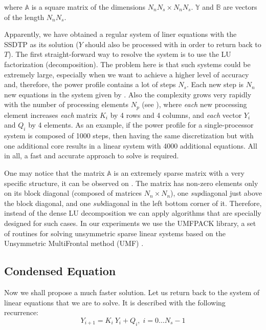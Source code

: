 where $\mathbb{A}$ is a square matrix of the dimensions $N_n N_s \times N_n N_s$. $\mathbb{Y}$ and $\mathbb{B}$ are vectors of the length $N_n N_s$.

Apparently, we have obtained a regular system of liner equations with the SSDTP as its solution ($Y$ should also be processed with  in order to return back to $T$). The first straight-forward way to resolve the system is to use the LU factorization (decomposition). The problem here is that such systems could be extremely large, especially when we want to achieve a higher level of accuracy and, therefore, the power profile contains a lot of steps $N_s$. Each new step is $N_n$ new equations in the system given by . Also the complexity grows very rapidly with the number of processing elements $N_p$ (see ), where \emph{each} new processing element increases \emph{each} matrix $K_i$ by 4 rows and 4 columns, and \emph{each} vector $Y_i$ and $Q_i$ by 4 elements. As an example, if the power profile for a single-processor system is composed of 1000 steps, then having the same discretization but with one additional core results in a linear system with 4000 additional equations. All in all, a fast and accurate approach to solve  is required.

One may notice that the matrix $\mathbb{A}$ is an extremely sparse matrix with a very specific structure, it can be observed on . The matrix has non-zero elements only on its block diagonal (composed of matrices $N_n \times N_n$), one \emph{sup}diagonal just above the block diagonal, and one \emph{sub}diagonal in the left bottom corner of it. Therefore, instead of the dense LU decomposition we can apply algorithms that are specially designed for such cases. In our experiments we use the UMFPACK library, a set of routines for solving unsymmetric sparse linear systems based on the Unsymmetric MultiFrontal method (UMF) \cite{umfpack2004}.

\subsection{Condensed Equation}
Now we shall propose a much faster solution. Let us return back to the system of linear equations that we are to solve. It is described with the following recurrence:
\begin{equation} \label{eq:ce-recurrent}
  Y_{i + 1} = K_i \: Y_i + Q_i, \; i = 0 \dots N_s - 1
\end{equation}


